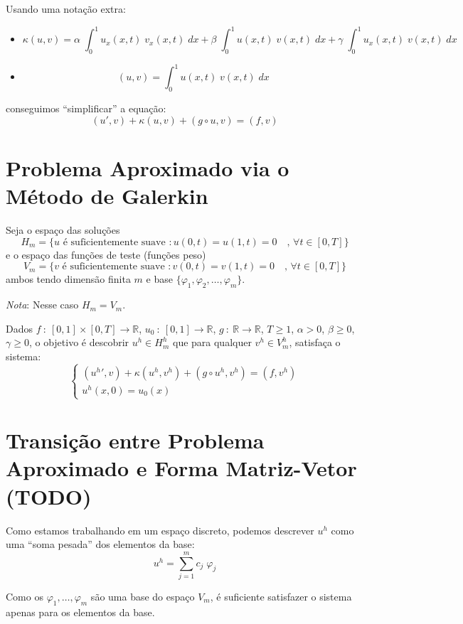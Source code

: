 \documentclass[a4paper]{article}
\newcommand{\typ}{\::\:}
\newcommand{\vphi}{\varphi}
\begin{document}
Usando uma notação extra:
\begin{itemize}
\item \[
    \kappa(u, v) =
    \alpha \; \int_0^1{ u_x(x, t) \; v_x(x, t) \; dx }
    + \beta \; \int_0^1{ u(x, t) \; v(x, t) \; dx }
    + \gamma \; \int_0^1{ u_x(x, t) \; v(x, t) \; dx}
\]
\item \[
    (u, v) =
    \int_0^1{ u(x, t) \; v(x, t) \; dx }
\]
\end{itemize}
conseguimos ``simplificar'' a equação:
\[
    (u', v)
    + \kappa(u, v)
    + (g \circ u, v)
    = (f, v)
\]

\section{Problema Aproximado via o Método de Galerkin}

Seja o espaço das soluções
\[
    H_m = \{
        u \text{ é suficientemente suave } : u(0, t) = u(1, t) = 0
        \quad\text{, } \forall t \in [0, T]
    \}
\]
e o espaço das funções de teste (funções peso)
\[
    V_m = \{
        v \text{ é suficientemente suave } : v(0, t) = v(1, t) = 0
        \quad\text{, } \forall t \in [0, T]
    \}
\]
ambos tendo dimensão finita \(m\)
e base \(\{ \vphi_1, \vphi_2, \dots, \vphi_m\}\).

\emph{Nota}: Nesse caso \(H_m = V_m\).

Dados
\(f \typ [0, 1] \times [0, T] \to \mathbb{R}\),
\(u_0 \typ [0, 1] \to \mathbb{R}\),
\(g \typ \mathbb{R} \to \mathbb{R}\),
\(T \ge 1\),
\(\alpha > 0\),
\(\beta \ge 0\),
\(\gamma \ge 0\),
o objetivo é descobrir \(u^h \in H^h_m\)
que para qualquer \(v^h \in V^h_m\),
satisfaça o sistema:
\[ \begin{cases}
    (u^h{}', v)
    + \kappa(u^h, v^h)
    + (g \circ u^h, v^h)
    = (f, v^h)
    \\
    u^h(x, 0) = u_0(x)
\end{cases} \]

\section{Transição entre Problema Aproximado e Forma Matriz-Vetor (TODO)}

Como estamos trabalhando em um espaço discreto,
podemos descrever \(u^h\)
como uma ``soma pesada'' dos elementos da base:
\[
    u^h = \sum_{j=1}^m{ c_j \; \vphi_j }
\]


Como os \(\vphi_1, \dots, \vphi_m\)
são uma base do espaço \(V_m\),
é suficiente satisfazer o sistema
apenas para os elementos da base.
\end{document}
